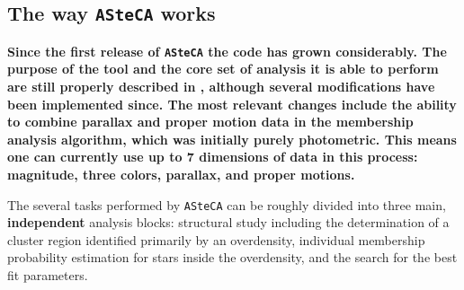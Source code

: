 \documentclass[referee]{aa}
\begin{document}
\subsection{The way \texttt{ASteCA} works}
\label{ssec:asteca_works}

\textbf{Since the first release of \texttt{ASteCA} the code has grown
considerably. The purpose of the tool and the core set of analysis it is able
to perform are still properly described in \cite{Perren_2015}, although
several modifications have been implemented since. The most relevant changes
include the ability to combine parallax and proper motion data in the
membership analysis algorithm, which was initially purely photometric. This
means one can currently use up to 7 dimensions of data in this process:
magnitude, three colors, parallax, and proper motions.
}

The several tasks performed by \texttt{ASteCA} can be roughly divided into three
main, \textbf{independent} analysis blocks: structural study including the
determination of a cluster region identified primarily by an overdensity,
individual membership probability estimation for stars inside the overdensity,
and the search for the best fit parameters.\\
\end{document}
